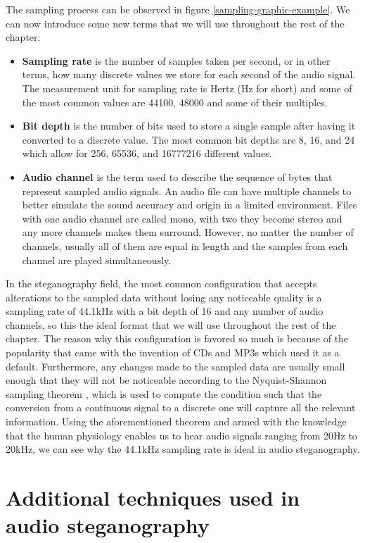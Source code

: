 \begin{multicols*}{2}
The sampling process can be observed in figure \ref{sampling-graphic-example}. We can now introduce some new terms that we will use throughout the rest of the chapter:
\begin{itemize}
	\item \textbf{Sampling rate} is the number of samples taken per second, or in other terms, how many discrete values we store for each second of the audio signal. The measurement unit for sampling rate is Hertz (Hz for short) and some of the most common values are 44100, 48000 and some of their multiples.
	\item \textbf{Bit depth} is the number of bits used to store a single sample after having it converted to a discrete value. The most common bit depths are 8, 16, and 24 which allow for 256, 65536, and 16777216 different values. 
	\item \textbf{Audio channel} is the term used to describe the sequence of bytes that represent sampled audio signals. An audio file can have multiple channels to better simulate the sound accuracy and origin in a limited environment. Files with one audio channel are called mono, with two they become stereo and any more channels makes them surround. However, no matter the number of channels, usually all of them are equal in length and the samples from each channel are played simultaneously.
\end{itemize}

In the steganography field, the most common configuration that accepts alterations to the sampled data without losing any noticeable quality is a sampling rate of 44.1kHz with a bit depth of 16 and any number of audio channels, so this the ideal format that we will use throughout the rest of the chapter. The reason why this configuration is favored so much is because of the popularity that came with the invention of CDs and MP3s which used it as a default. Furthermore, any changes made to the sampled data are usually small enough that they will not be noticeable according to the Nyquist-Shannon sampling theorem \cite{Shannon1949}, which is used to compute the condition such that the conversion from a continuous signal to a discrete one will capture all the relevant information. Using the aforementioned theorem and armed with the knowledge that the human physiology enables us to hear audio signals ranging from 20Hz to 20kHz, we can see why the 44.1kHz sampling rate is ideal in audio steganography.

\section{Additional techniques used in audio steganography}

\end{multicols*}

